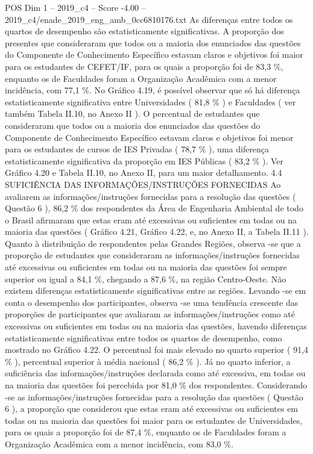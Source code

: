 \begin{textsample}{POS Dim 1 – 2019\_c4 – Score -4.00 – 2019\_c4/enade\_2019\_eng\_amb\_0cc6810176.txt}
As diferenças entre todos os quartos de desempenho são estatisticamente significativas.
A proporção dos presentes que consideraram que todos ou a maioria dos enunciados das questões do Componente de Conhecimento Específico estavam claros e objetivos foi maior para os estudantes de CEFET/IF, para os quais a proporção foi de 83,3 \%, enquanto os de Faculdades foram a Organização Acadêmica com a menor incidência, com 77,1 \%.
No Gráfico 4.19, é possível observar que só há diferença estatisticamente significativa entre Universidades ( 81,8 \% ) e Faculdades ( ver também Tabela II.10, no Anexo II ).
O percentual de estudantes que consideraram que todos ou a maioria dos enunciados das questões do Componente de Conhecimento Específico estavam claros e objetivos foi menor para os estudantes de cursos de IES Privadas ( 78,7 \% ), uma diferença estatisticamente significativa da proporção em IES Públicas ( 83,2 \% ).
Ver Gráfico 4.20 e Tabela II.10, no Anexo II, para um maior detalhamento. 4.4 SUFICIÊNCIA DAS INFORMAÇÕES/INSTRUÇÕES FORNECIDAS Ao avaliarem as informações/instruções fornecidas para a resolução das questões ( Questão 6 ), 86,2 \% dos respondentes da Área de Engenharia Ambiental de todo o Brasil afirmaram que estas eram até excessivas ou suficientes em todas ou na maioria das questões ( Gráfico 4.21, Gráfico 4.22, e, no Anexo II, a Tabela II.11 ).
Quanto à distribuição de respondentes pelas Grandes Regiões, observa -se que a proporção de estudantes que consideraram as informações/instruções fornecidas até excessivas ou suficientes em todas ou na maioria das questões foi sempre superior ou igual a 84,1 \%, chegando a 87,6 \%, na região Centro-Oeste.
Não existem diferenças estatisticamente significativas entre as regiões.
Levando -se em conta o desempenho dos participantes, observa -se uma tendência crescente das proporções de participantes que avaliaram as informações/instruções como até excessivas ou suficientes em todas ou na maioria das questões, havendo diferenças estatisticamente significativas entre todos os quartos de desempenho, como mostrado no Gráfico 4.22.
O percentual foi mais elevado no quarto superior ( 91,4 \% ), percentual superior à média nacional ( 86,2 \% ).
Já no quarto inferior, a suficiência das informações/instruções declarada como até excessiva, em todas ou na maioria das questões foi percebida por 81,0 \% dos respondentes.
Considerando -se as informações/instruções fornecidas para a resolução das questões ( Questão 6 ), a proporção que considerou que estas eram até excessivas ou suficientes em todas ou na maioria das questões foi maior para os estudantes de Universidades, para os quais a proporção foi de 87,4 \%, enquanto os de Faculdades foram a Organização Acadêmica com a menor incidência, com 83,0 \%.

\end{textsample}
